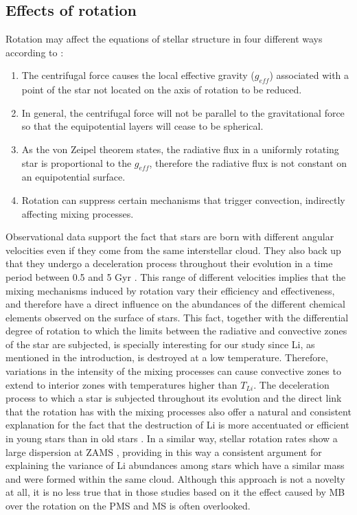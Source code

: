 \documentclass[fleqn,usenatbib]{mnras}
\begin{document}
\subsection{Effects of rotation}
Rotation may affect the equations of stellar structure in four different ways according to \citet{Endal1976}:
\begin{enumerate}
    \item The centrifugal force causes the local effective gravity ($g_{eff}$) associated with a point of the star not located on the axis of rotation to be reduced.
    \item In general, the centrifugal force will not be parallel to the gravitational force so that the equipotential layers will cease to be spherical.
    \item As the von Zeipel theorem states, the radiative flux in a uniformly rotating star is proportional to the $g_{eff}$, therefore the radiative flux is not constant on an equipotential surface.
    \item Rotation can suppress certain mechanisms that trigger convection, indirectly affecting mixing processes.
\end{enumerate}

Observational data support the fact that stars are born with different angular velocities even if they come from the same interstellar cloud. They also back up that they undergo a deceleration process throughout their evolution \citep{Skumanich1972} in a time period between 0.5 and 5 Gyr \citep{Somers2014a}. This range of different velocities implies that the mixing mechanisms induced by rotation vary their efficiency and effectiveness, and therefore have a direct influence on the abundances of the different chemical elements observed on the surface of stars. This fact, together with the differential degree of rotation to which the limits between the radiative and convective zones of the star are subjected, is specially interesting for our study since Li, as mentioned in the introduction, is destroyed at a low temperature. Therefore, variations in the intensity of the mixing processes can cause convective zones to extend to interior zones with temperatures higher than $T_{Li}$. The deceleration process to which a star is subjected throughout its evolution and the direct link that the rotation has with the mixing processes also offer a natural and consistent explanation for the fact that the destruction of Li is more accentuated or efficient in young stars than in old stars \citep{Sestito2005}. In a similar way, stellar rotation rates show a large dispersion at ZAMS \citep{Stauffer1984}, providing in this way a consistent argument for explaining the variance of Li abundances among stars which have a similar mass and were formed within the same cloud. Although this approach is not a novelty at all, it is no less true that in those studies based on it the effect caused by MB over the rotation on the PMS and MS is often overlooked. \par
\end{document}
